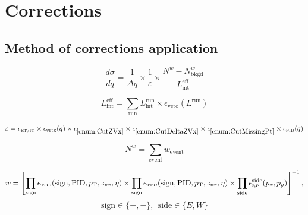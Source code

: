 

\chapter{Corrections}\label{chap:corrections}

\section{Method of corrections application}\label{sec:correctionProcedure}
\begin{equation}
  \frac{d\sigma}{dq} = \frac{1}{\Delta q} \times \frac{1}{\varepsilon} \times \frac{N^{\mathit{w}}-N^{\mathit{w}}_\textrm{bkgd}}{\mathit{L}_{\textrm{int}}^{\textrm{eff}}}
\end{equation}

\begin{equation}\label{eq:effectiveLumi}
	\mathit{L}_{\textrm{int}}^{\textrm{eff}} = \sum\limits_{\textrm{run}}\mathit{L}_{\textrm{int}}^{\textrm{run}} \times \epsilon_{\textrm{veto}}(L^{\textrm{run}})
\end{equation}

\begin{equation}
	\varepsilon = \epsilon_{\textrm{\tiny ET/IT}} \times \epsilon_{\textrm{vrtx}}(q) \times \epsilon_{\ref{enum:CutZVx}} \times \epsilon_{\ref{enum:CutDeltaZVx}} \times \epsilon_{\ref{enum:CutMissingPt}} \times \epsilon_{\textrm{\tiny PID}}(q)
\end{equation}

\begin{equation}
	N^{\mathit{w}} = \sum\limits_{\textrm{event}}\mathit{w}_{\textrm{event}}
\end{equation}



\begin{equation}\label{eq:weight}
	\mathit{w} = \left[\prod\limits_{\textrm{sign}} \epsilon_{\textrm{\tiny TOF}}(\textrm{sign}, \textrm{PID}, p_{\text{T}},z_{vx},\eta)  \times \prod\limits_{\textrm{sign}} \epsilon_{\textrm{\tiny TPC}}(\textrm{sign}, \textrm{PID}, p_{\text{T}},z_{vx},\eta) \times \prod\limits_{\textrm{side}}\epsilon_{\textrm{\tiny RP}}^{\textrm{side}}(p_{x},p_{y}) \right]^{-1},
\end{equation}
\[\textrm{sign}\in\{+,-\},~~\textrm{side}\in\{E,W\}\]




